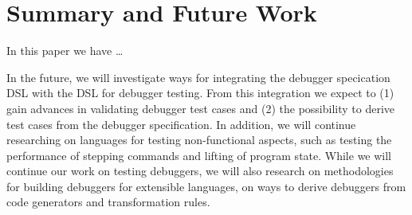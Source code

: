 \section{Summary and Future Work}

In this paper we have \ldots

In the future, we will investigate ways for integrating the debugger specication
\ac{DSL} with the \ac{DSL} for debugger testing. From this integration we
expect to (1) gain advances in validating debugger test cases and
(2) the possibility to derive test cases from the debugger specification. 
In addition, we will continue researching on languages for testing
non-functional aspects, such as testing the performance of stepping commands and
lifting of program state.
While we will continue our work on testing debuggers, we will also
research on methodologies for building debuggers for extensible
languages, \ie on ways to derive debuggers from code generators and
transformation rules.